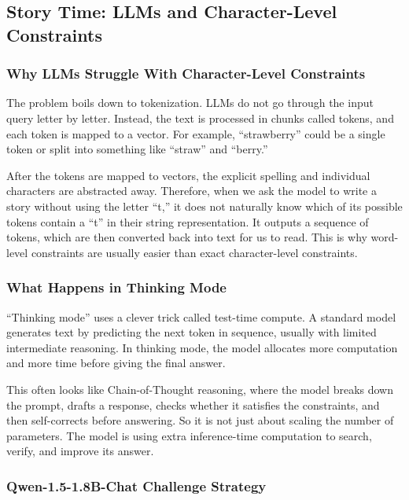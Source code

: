 \documentclass[11pt,a4paper]{article}
\newcommand{\answergap}{\vspace{0.9em}}
\begin{document}
\subsection{Story Time: LLMs and Character-Level Constraints}

\subsubsection{Why LLMs Struggle With Character-Level Constraints}
The problem boils down to tokenization. LLMs do not go through the input query letter by letter. Instead, the text is processed in chunks called tokens, and each token is mapped to a vector. For example, ``strawberry'' could be a single token or split into something like ``straw'' and ``berry.''

After the tokens are mapped to vectors, the explicit spelling and individual characters are abstracted away. Therefore, when we ask the model to write a story without using the letter ``t,'' it does not naturally know which of its possible tokens contain a ``t'' in their string representation. It outputs a sequence of tokens, which are then converted back into text for us to read. This is why word-level constraints are usually easier than exact character-level constraints.

\subsubsection{What Happens in Thinking Mode}
``Thinking mode'' uses a clever trick called test-time compute. A standard model generates text by predicting the next token in sequence, usually with limited intermediate reasoning. In thinking mode, the model allocates more computation and more time before giving the final answer.

This often looks like Chain-of-Thought reasoning, where the model breaks down the prompt, drafts a response, checks whether it satisfies the constraints, and then self-corrects before answering. So it is not just about scaling the number of parameters. The model is using extra inference-time computation to search, verify, and improve its answer.

\subsubsection{Qwen-1.5-1.8B-Chat Challenge Strategy}
\answergap
\end{document}
